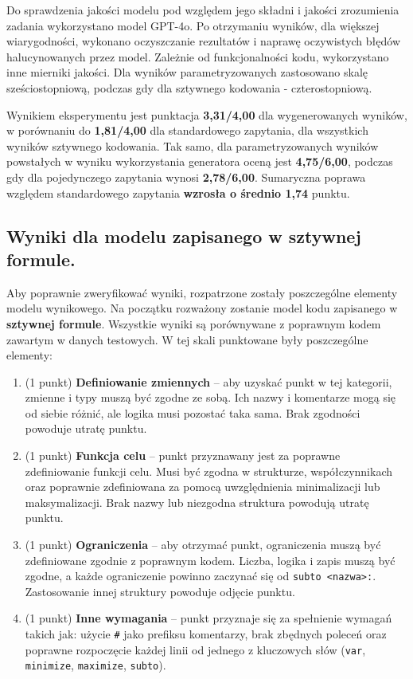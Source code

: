Do sprawdzenia jakości modelu pod względem jego składni i jakości zrozumienia zadania wykorzystano model GPT-4o. Po otrzymaniu wyników, dla większej wiarygodności, wykonano oczyszczanie rezultatów i naprawę oczywistych błędów halucynowanych przez model. Zależnie od funkcjonalności kodu, wykorzystano inne mierniki jakości. Dla wyników parametryzowanych zastosowano skalę sześciostopniową, podczas gdy dla sztywnego kodowania - czterostopniową.

Wynikiem eksperymentu jest punktacja \textbf{3,31/4,00} dla wygenerowanych wyników, w porównaniu do \textbf{1,81/4,00} dla standardowego zapytania, dla wszystkich wyników sztywnego kodowania. Tak samo, dla parametryzowanych wyników powstałych w wyniku wykorzystania generatora oceną jest \textbf{4,75/6,00}, podczas gdy dla pojedynczego zapytania wynosi \textbf{2,78/6,00}. Sumaryczna poprawa względem standardowego zapytania \textbf{wzrosła o średnio 1,74} punktu.

\subsection{Wyniki dla modelu zapisanego w sztywnej formule.}

Aby poprawnie zweryfikować wyniki, rozpatrzone zostały poszczególne elementy modelu wynikowego. Na początku rozważony zostanie model kodu zapisanego w \textbf{sztywnej formule}. Wszystkie wyniki są porównywane z poprawnym kodem zawartym w danych testowych. W tej skali punktowane były poszczególne elementy:

\begin{enumerate}
\item (1 punkt) \textbf{Definiowanie zmiennych} -- aby uzyskać punkt w tej kategorii, zmienne i typy muszą być zgodne ze sobą. Ich nazwy i komentarze mogą się od siebie różnić, ale logika musi pozostać taka sama. Brak zgodności powoduje utratę punktu.
\item (1 punkt) \textbf{Funkcja celu} -- punkt przyznawany jest za poprawne zdefiniowanie funkcji celu. Musi być zgodna w strukturze, współczynnikach oraz poprawnie zdefiniowana za pomocą uwzględnienia minimalizacji lub maksymalizacji. Brak nazwy lub niezgodna struktura powodują utratę punktu.
\item (1 punkt) \textbf{Ograniczenia} -- aby otrzymać punkt, ograniczenia muszą być zdefiniowane zgodnie z poprawnym kodem. Liczba, logika i zapis muszą być zgodne, a każde ograniczenie powinno zaczynać się od \texttt{subto <nazwa>:}. Zastosowanie innej struktury powoduje odjęcie punktu.
\item (1 punkt) \textbf{Inne wymagania} -- punkt przyznaje się za spełnienie wymagań takich jak: użycie \texttt{\#} jako prefiksu komentarzy, brak zbędnych poleceń oraz poprawne rozpoczęcie każdej linii od jednego z kluczowych słów (\texttt{var}, \texttt{minimize}, \texttt{maximize}, \texttt{subto}).
\end{enumerate}

